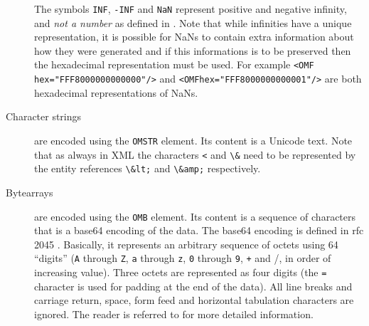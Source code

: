 \documentclass{report}
\def\textquote#1{``#1''}
\def\XML{XML\xspace}
\def\acronym#1{\textsf{#1}}
\begin{document}
\begin{description}
 
  The symbols \lstinline|INF|, \lstinline|-INF| and \lstinline|NaN| represent positive
  and negative infinity, and \emph{not a number} as defined in \cite{ieee754_85}.  Note
  that while infinities have a unique representation, it is possible for NaNs to contain
  extra information about how they were generated and if this informations is to be
  preserved then the hexadecimal representation must be used.  For example
  \lstinline|<OMF hex="FFF8000000000000"/>| and 
\lstinline|<OMFhex="FFF8000000000001"/>| are both hexadecimal representations of NaNs.
\item[Character strings] are encoded using the \lstinline|OMSTR| element.  Its
  content is a Unicode text. Note that as always in \XML the characters \lstinline|<| and
  \lstinline|\&| need to be represented by the entity references \lstinline|\&lt;|
  and \lstinline|\&amp;| respectively.
\item[Bytearrays] are encoded using the \lstinline|OMB| element. Its content is
  a sequence of characters that is a base64 encoding of the data.  The base64 encoding is
  defined in \acronym{rfc} 2045 \cite{rfc2045}.  Basically, it represents an arbitrary
  sequence of octets using 64 \textquote{digits} (\lstinline|A| through \lstinline|Z|,
  \lstinline|a| through \lstinline|z|, \lstinline|0| through \lstinline|9|,
  \lstinline|+| and /, in order of increasing value). Three octets are represented as
  four digits (the \lstinline|=| character is used for padding at the end of the
  data). All line breaks and carriage return, space, form feed and horizontal tabulation
  characters are ignored. The reader is referred to \cite{rfc2045} for more detailed
  information.
\end{description}
 
\end{document}
